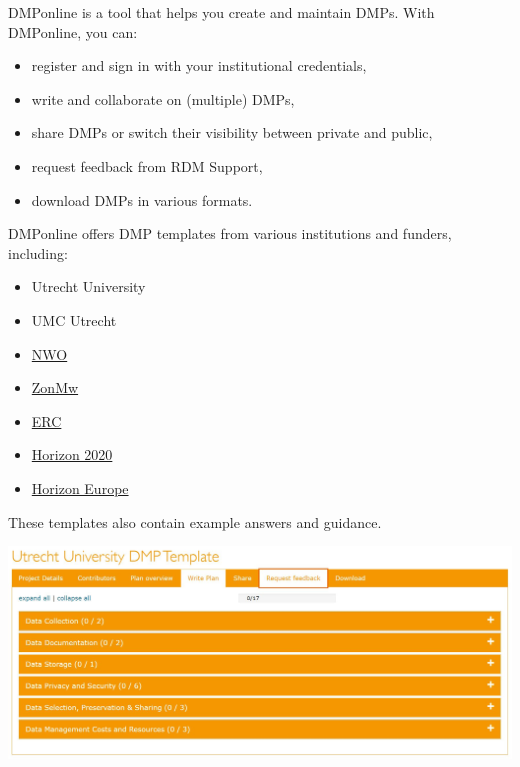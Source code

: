 \documentclass[
  letterpaper,
  DIV=11,
  numbers=noendperiod]{scrreprt}
\providecommand{\tightlist}{%
  \setlength{\itemsep}{0pt}\setlength{\parskip}{0pt}}\usepackage{longtable,booktabs,array}
\begin{document}

DMPonline is a tool that helps you create and maintain DMPs. With
DMPonline, you can:

\begin{itemize}
\tightlist
\item
  register and sign in with your institutional credentials,
\item
  write and collaborate on (multiple) DMPs,
\item
  share DMPs or switch their visibility between private and public,
\item
  request feedback from RDM Support,
\item
  download DMPs in various formats.
\end{itemize}

DMPonline offers DMP templates from various institutions and funders,
including:

\begin{itemize}
\tightlist
\item
  Utrecht University
\item
  UMC Utrecht
\item
  \href{https://dmponline.dcc.ac.uk/template_export/1753695087.pdf}{NWO}
\item
  \href{https://dmponline.dcc.ac.uk/template_export/1461074155.pdf}{ZonMw}
\item
  \href{https://dmponline.dcc.ac.uk/template_export/2088403152.pdf}{ERC}
\item
  \href{https://dmponline.dcc.ac.uk/template_export/1612436782.pdf}{Horizon
  2020}
\item
  \href{https://dmponline.dcc.ac.uk/template_export/5992485.pdf}{Horizon
  Europe}
\end{itemize}

These templates also contain example answers and guidance.

\includegraphics{images/uu-dmp-template.JPG}
\end{document}
